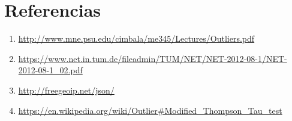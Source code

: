 \section{Referencias}

\begin{enumerate}
\item \url{http://www.mne.psu.edu/cimbala/me345/Lectures/Outliers.pdf}
\item \url{https://www.net.in.tum.de/fileadmin/TUM/NET/NET-2012-08-1/NET-2012-08-1_02.pdf}
\item \url{http://freegeoip.net/json/}
\item \url{https://en.wikipedia.org/wiki/Outlier\#Modified_Thompson_Tau_test}
\end{enumerate}

